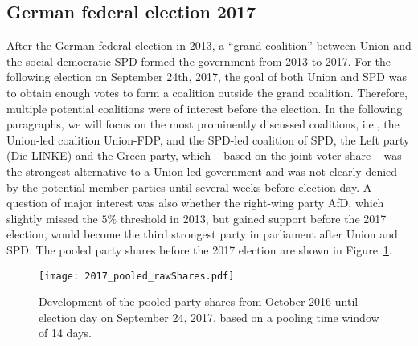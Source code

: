 \documentclass[smallextended]{svjour3}      %
\begin{document}



\subsection{German federal election 2017} \label{subsec:2017}
After the German federal election in 2013, a ``grand coalition'' between Union and the social
democratic SPD formed the government from 2013 to 2017.
For the following election on September 24th, 2017, the goal of both Union and SPD
was to obtain enough votes to form a coalition outside the grand
coalition. Therefore, multiple potential coalitions were of interest before the
election. In the following paragraphs, we will focus on the most prominently
discussed coalitions, i.e., the Union-led coalition Union-FDP, and the
SPD-led coalition of SPD, the Left party (Die LINKE) and the Green party, which
-- based on the joint voter share -- was the strongest alternative to a Union-led
government and was not clearly denied by the potential member parties until several weeks
before election day.
A question of major interest was also whether the right-wing party AfD, which
slightly missed the $5\%$ threshold in 2013, but gained support before the 2017 election,
would become the third strongest party in parliament after Union and SPD.
The pooled party shares before the 2017 election are shown in Figure~\ref{fig:2017}.

\begin{figure}[H]\centering
\texttt{[image: 2017\_pooled\_rawShares.pdf]}
\caption{Development of the pooled party shares from October 2016 until
election day on September 24, 2017, based on a pooling time window of 14 days.
\label{fig:2017}
}
\end{figure}
\end{document}
